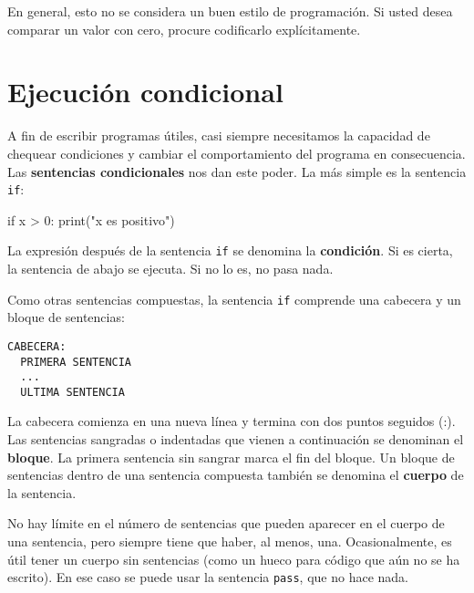 En general, esto no se considera un buen estilo de programación. Si
usted desea comparar un valor con cero, procure codificarlo explícitamente.

\section{Ejecución condicional}

\label{alternative execution} 

A fin de escribir programas útiles, casi siempre necesitamos la capacidad
de chequear condiciones y cambiar el comportamiento del programa en
consecuencia. Las \textbf{sentencias condicionales} nos dan este poder.
La más simple es la sentencia \texttt{if}: 
\begin{pythoncode}
if x > 0:
  print("x es positivo")
\end{pythoncode}

La expresión después de la sentencia \texttt{if} se denomina la \textbf{condición}.
Si es cierta, la sentencia de abajo se ejecuta. Si no lo es, no pasa
nada.

 
 

Como otras sentencias compuestas, la sentencia \texttt{if} comprende
una cabecera y un bloque de sentencias:
\begin{verbatim}
CABECERA:
  PRIMERA SENTENCIA
  ...
  ULTIMA SENTENCIA
\end{verbatim}
La cabecera comienza en una nueva línea y termina con dos puntos seguidos
(:). Las sentencias sangradas o indentadas que vienen a continuación
se denominan el \textbf{bloque}. La primera sentencia sin sangrar
marca el fin del bloque. Un bloque de sentencias dentro de una sentencia
compuesta también se denomina el \textbf{cuerpo} de la sentencia.

  

No hay límite en el número de sentencias que pueden aparecer en el
cuerpo de una sentencia, pero siempre tiene que haber, al menos, una.
Ocasionalmente, es útil tener un cuerpo sin sentencias (como un hueco
para código que aún no se ha escrito). En ese caso se puede usar la
sentencia \texttt{pass}, que no hace nada.

 

